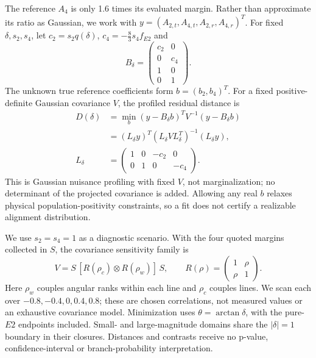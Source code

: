 \documentclass[pdflatex,iicol,sn-mathphys-num]{sn-jnl}
\begin{document}
The reference \(A_4\) is only 1.6 times its evaluated margin. Rather than approximate its ratio as Gaussian, we work with
\(y=(A_{2,t},A_{4,t},A_{2,r},A_{4,r})^T\).
For fixed \(\delta,s_2,s_4\), let \(c_2=s_2q(\delta)\),
\(c_4=-\tfrac83s_4f_{E2}\) and
\begin{equation}
 B_\delta=\begin{pmatrix}c_2&0\\0&c_4\\1&0\\0&1\end{pmatrix}.
\end{equation}
The unknown true reference coefficients form \(b=(b_2,b_4)^T\). For a fixed positive-definite Gaussian covariance \(V\), the profiled residual distance is
\begin{align}
 D(\delta)&=\min_b(y-B_\delta b)^T V^{-1}(y-B_\delta b)\\
 &= (L_\delta y)^T(L_\delta V L_\delta^T)^{-1}(L_\delta y),
 \label{eq:profile}\\
 L_\delta&=\begin{pmatrix}1&0&-c_2&0\\0&1&0&-c_4\end{pmatrix}.
\end{align}
This is Gaussian nuisance profiling with fixed \(V\), not marginalization; no determinant of the projected covariance is added. Allowing any real \(b\) relaxes physical population-positivity constraints, so a fit does not certify a realizable alignment distribution.

We use \(s_2=s_4=1\) as a diagnostic scenario. With the four quoted margins collected in \(S\), the covariance sensitivity family is
\begin{equation}
 V=S\,[R(\rho_c)\otimes R(\rho_w)]\,S,
 \qquad R(\rho)=\begin{pmatrix}1&\rho\\\rho&1\end{pmatrix}.
\end{equation}
Here \(\rho_w\) couples angular ranks within each line and \(\rho_c\) couples lines. We scan each over \(-0.8,-0.4,0,0.4,0.8\); these are chosen correlations, not measured values or an exhaustive covariance model. Minimization uses \(\theta=\arctan\delta\), with the pure-\(E2\) endpoints included. Small- and large-magnitude domains share the \(\lvert\delta\rvert=1\) boundary in their closures. Distances and contrasts receive no p-value, confidence-interval or branch-probability interpretation.
\end{document}
